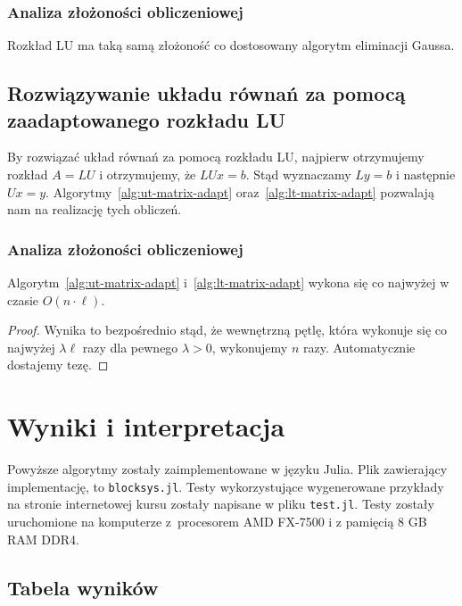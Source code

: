 \documentclass[../main.tex]{subfiles}
\begin{document}
  \subsection{Analiza złożoności obliczeniowej}
  Rozkład LU ma taką samą złożoność co dostosowany algorytm eliminacji Gaussa.

  \section{Rozwiązywanie układu równań za pomocą zaadaptowanego rozkładu LU}
  By rozwiązać układ równań za pomocą rozkładu LU, najpierw
  otrzymujemy rozkład \( A = LU \) i otrzymujemy,
  że \( LUx = b \). Stąd wyznaczamy \( Ly = b \) 
  i następnie \( Ux = y \). Algorytmy~\ref{alg:ut-matrix-adapt}
  oraz~\ref{alg:lt-matrix-adapt} pozwalają nam na realizację
  tych obliczeń.

  \subsection{Analiza złożoności obliczeniowej}

  \begin{fact} %
    Algorytm~\ref{alg:ut-matrix-adapt} i~\ref{alg:lt-matrix-adapt} wykona się
    co najwyżej w czasie \( O(n \cdot \ell) \).
  \end{fact}
  \begin{proof}
    Wynika to bezpośrednio stąd, że wewnętrzną pętlę, która wykonuje się
    co najwyżej \( \lambda \ell \) razy dla pewnego \( \lambda > 0 \), wykonujemy
    \( n \) razy. Automatycznie dostajemy tezę.
  \end{proof}

  \chapter{Wyniki i interpretacja}

  Powyższe algorytmy zostały zaimplementowane w języku Julia. Plik zawierający implementację,
  to \verb|blocksys.jl|. Testy wykorzystujące wygenerowane przykłady na stronie internetowej
  kursu zostały napisane w pliku \verb|test.jl|. Testy zostały uruchomione na komputerze
  z~procesorem AMD FX-7500 i z pamięcią 8 GB RAM DDR4. 

  \section{Tabela wyników}
\end{document}
